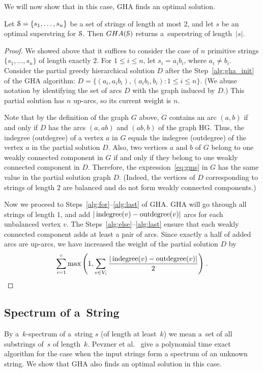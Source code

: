 We will now show that in this case, GHA finds an optimal solution.

\begin{lemma}
Let ${\cal S}=\{s_1,\ldots,s_n\}$ be a set of strings of length at most $2$, and let $s$ be an optimal superstring for ${\cal S}$. Then $GHA({\cal S})$ returns a~superstring of length~$|s|$. 
\end{lemma}

\begin{proof}
We showed above that it suffices to consider the case of $n$ primitive strings $\{s_1,\ldots,s_n\}$ of length exactly $2$. For $1\leq i\leq n$, let $s_i=a_i b_i$, where $a_i\neq b_i$. Consider the partial greedy hierarchical solution $D$ after the Step~\ref{alg:gha_init} of the GHA algorithm: $D=\{(a_i, a_ib_i), (a_ib_i, b_i): 1\leq i\leq n \}$. (We abuse notation by identifying the set of arcs $D$ with the graph induced by $D$.) This partial solution has $n$ up-arcs, so its current weight is $n$. 

Note that by the definition of the graph $G$ above, $G$ contains an arc $(a, b)$ if and only if $D$ has the arcs $(a, ab)$ and $(ab, b)$ of the graph HG. Thus, the indegree (outdegree) of a vertex $a$ in $G$ equals the indegree (outdegree) of the vertex $a$ in the partial solution $D$. Also, two vertices $a$ and $b$ of $G$ belong to one weakly connected component in $G$ if and only if they belong to one weakly connected component in $D$. Therefore, the expression~\eqref{eq:gms} in $G$ has the same value in the partial solution graph $D$. (Indeed, the vertices of $D$ corresponding to strings of length $2$ are balanced and do not form weakly connected components.) 

Now we proceed to Steps~\ref{alg:for}--\ref{alg:last} of GHA. GHA will go through all strings of length $1$, and add $|\operatorname{indegree}(v) - \operatorname{outdegree}(v)|$ arcs for each unbalanced vertex $v$. The Steps~\ref{alg:else}--\ref{alg:last} ensure that each weakly connected component adds at least a pair of arcs. Since exactly a half of added arcs are up-arcs, we have increased the weight of the partial solution $D$ by
\begin{align*}
\sum_{i=1}^{c} {\max\left( 1, \sum_{v \in V_i}{ \frac{ |\operatorname{indegree}(v) - \operatorname{outdegree}(v)|}{2} }\right)} \; .
\end{align*}
\end{proof}

\subsection{Spectrum of a~String}\label{sec:ghaspectrum}
By a~$k$-spectrum of a~string $s$ 
(of length at least~$k$)
we mean a~set of all substrings of~$s$ of length~$k$.
Pevzner et al.~\cite{pevzner2001eulerian} give a polynomial time exact algorithm for the case when the input strings form a spectrum of an unknown string. We show that GHA also finds an optimal solution in this case.

